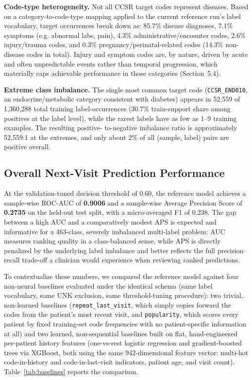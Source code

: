 \documentclass[11pt]{article}
\begin{document}
\textbf{Code-type heterogeneity.} Not all CCSR target codes represent
diseases. Based on a category-to-code-type mapping applied to the current
reference run's label vocabulary, target occurrences break down as: 85.7\%
disease diagnoses, 7.1\% symptoms (e.g. abnormal labs, pain), 4.3\%
administrative/encounter codes, 2.6\% injury/trauma codes, and 0.3\%
pregnancy/perinatal-related codes (14.3\% non-disease codes in total). Injury
and symptom codes are, by nature, driven by acute and often unpredictable
events rather than temporal progression, which materially caps achievable
performance in those categories (Section~5.4).

\textbf{Extreme class imbalance.} The single most common target code
(\texttt{CCSR\_END010}, an endocrine/metabolic category consistent with
diabetes) appears in 52{,}559 of 1{,}360{,}288 total training label-occurrences
(30.7\% train-support share among positives at the label level), while the
rarest labels have as few as 1--9 training examples. The resulting positive-
to-negative imbalance ratio is approximately 52{,}559:1 at the extremes, and
only about 2\% of all (sample, label) pairs are positive overall.

\subsection{Overall Next-Visit Prediction Performance}

At the validation-tuned decision threshold of 0.60, the reference model
achieves a sample-wise ROC-AUC of \textbf{0.9006} and a sample-wise Average
Precision Score of \textbf{0.2735} on the held-out test split, with a
micro-averaged F1 of 0.238. The gap between a high AUC and a comparatively
modest APS is expected and informative for a 463-class, severely imbalanced
multi-label problem: AUC measures ranking quality in a class-balanced sense,
while APS is directly penalized by the underlying label imbalance and better
reflects the full precision--recall trade-off a clinician would experience
when reviewing ranked predictions.

To contextualize these numbers, we compared the reference model against four
non-neural baselines evaluated under the identical schema (same label
vocabulary, same UNK exclusion, same threshold-tuning procedure): two
trivial, non-learned baselines (\texttt{repeat\_last\_visit}, which simply
copies forward the codes from the patient's most recent visit, and
\texttt{popularity}, which scores every patient by fixed training-set code
frequencies with no patient-specific information at all) and two learned,
non-sequential baselines built on flat, hand-engineered per-patient history
features (one-vs-rest logistic regression and gradient-boosted trees via
XGBoost, both using the same 942-dimensional feature vector: multi-hot
code-in-history and code-in-last-visit indicators, patient age, and visit
count). Table~\ref{tab:baselines} reports the comparison.
\end{document}
